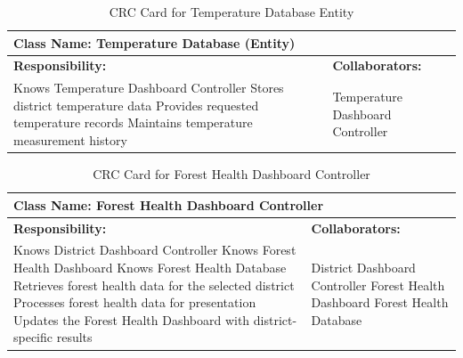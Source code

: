 \documentclass[]{article}
\begin{document}
\begin{table}[H]
    \centering
    \caption{CRC Card for Temperature Database Entity}
    \vspace{1mm}
    \begin{tabular}{|p{7.5cm}|p{7.5cm}|}
    \hline 
    \multicolumn{2}{|l|}{\textbf{Class Name: Temperature Database (Entity)}} \\
    \hline
    \textbf{Responsibility:} & \textbf{Collaborators:} \\
    \hline
        Knows Temperature Dashboard Controller \newline
        Stores district temperature data \newline
        Provides requested temperature records \newline
        Maintains temperature measurement history \newline
        &
        Temperature Dashboard Controller \\
    \hline
    \end{tabular}
\end{table}
\begin{table}[H]
    \centering
    \caption{CRC Card for Forest Health Dashboard Controller}
    \vspace{1mm}
    \begin{tabular}{|p{7.5cm}|p{7.5cm}|}
    \hline 
    \multicolumn{2}{|l|}{\textbf{Class Name: Forest Health Dashboard Controller}} \\
    \hline
    \textbf{Responsibility:} & \textbf{Collaborators:} \\
    \hline
        Knows District Dashboard Controller \newline
        Knows Forest Health Dashboard \newline
        Knows Forest Health Database \newline
        Retrieves forest health data for the selected district \newline
        Processes forest health data for presentation \newline
        Updates the Forest Health Dashboard with district-specific results \newline
        &
        District Dashboard Controller \newline
        Forest Health Dashboard \newline
        Forest Health Database \\
    \hline
    \end{tabular}
\end{table}
\end{document}
